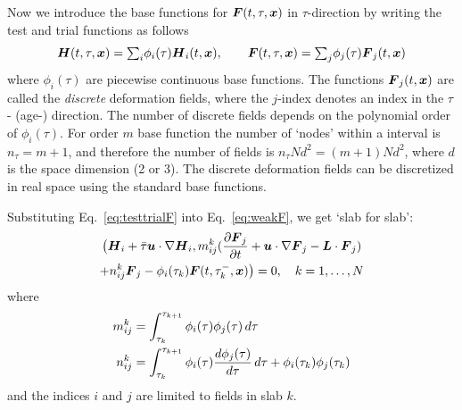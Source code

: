 Now we introduce the base functions for $\boldsymbol{F}(t,\tau,\boldsymbol{x})$ in $\tau$-direction by writing the test and trial functions as follows
\begin{equation}
   \boldsymbol{H}(t,\tau,\boldsymbol{x})={\textstyle\sum}_{i}\phi_i(\tau)\boldsymbol{H}_i(t,\boldsymbol{x}),\qquad
   \boldsymbol{F}(t,\tau,\boldsymbol{x})={\textstyle\sum}_{j}\phi_j(\tau)\boldsymbol{F}_j(t,\boldsymbol{x}) \label{eq:testtrialF}
\end{equation}
where $\phi_i(\tau)$ are piecewise continuous base functions. The functions $\boldsymbol{F}_j(t,\boldsymbol{x})$ are called the \emph{discrete} deformation fields, where the $j$-index denotes an index in the $\tau$- (age-) direction.
The number of discrete fields depends on the polynomial order of $\phi_i(\tau)$. For order $m$ base function the number of `nodes' within a interval is $n_\tau=m+1$, and therefore the number of fields is $n_\tau N d^2=(m+1)N d^2$, where $d$ is the space dimension (2 or 3).  
The discrete deformation fields can be discretized in real space using the standard base functions.
 
Substituting Eq.~\eqref{eq:testtrialF} into Eq.~\eqref{eq:weakF}, we get `slab for slab':
\begin{multline}
     \big(\boldsymbol{H}_i+\bar\tau\boldsymbol{u}\cdot\nabla\boldsymbol{H}_i,m^k_{ij}(\dfrac{\partial \boldsymbol{F}_j}{\partial t}+
           \boldsymbol{u}\cdot\nabla\boldsymbol{F}_j-\boldsymbol{L}\cdot \boldsymbol{F}_j)\\
             +n^k_{ij}\boldsymbol{F}_j
                    -\phi_i(\tau_k)\boldsymbol{F}(t,\tau^-_{k},\boldsymbol{x})\big)=0,\quad k=1,\dots,N
\end{multline}
where
\begin{align}
 m^k_{ij}&=\int_{\tau_k}^{\tau_{k+1}} \phi_i(\tau)\phi_j(\tau)\,d\tau\\	
 n^k_{ij}&=\int_{\tau_k}^{\tau_{k+1}} \phi_i(\tau)\dfrac{d \phi_j(\tau)}{d \tau}\,d\tau+
 \phi_i(\tau_k)\phi_j(\tau_k)
\end{align}
and the indices $i$ and $j$ are limited to fields in slab $k$.


